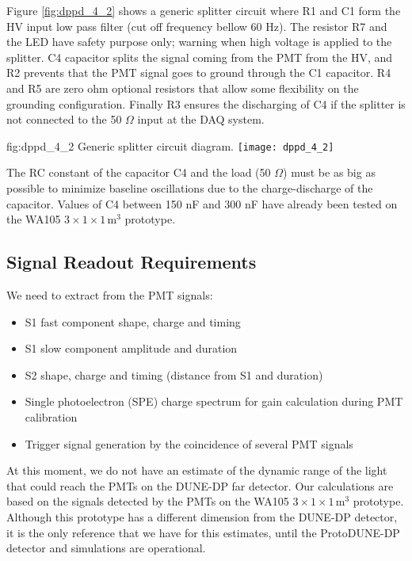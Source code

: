 Figure \ref{fig:dppd_4_2} shows a generic splitter circuit where R1 and C1 form the HV input low pass filter (cut off frequency bellow 60 Hz). The resistor R7 and the LED have safety purpose only; warning when high voltage is applied to the splitter. C4 capacitor splits the signal coming from the PMT from the HV, and R2 prevents that the PMT signal goes to ground through the C1 capacitor. R4 and R5 are zero ohm optional resistors that allow some flexibility on the grounding configuration. Finally R3 ensures the discharging of C4 if the splitter is not connected to the 50 $\Omega$ input at the DAQ system.

\begin{dunefigure}{fig:dppd_4_2}
{Generic splitter circuit diagram.}
\texttt{[image: dppd\_4\_2]}
\end{dunefigure}

The RC constant of the capacitor C4 and the load (50 $\Omega$) must be as big as possible to minimize baseline oscillations due to the charge-discharge of the capacitor. Values of C4 between 150 nF and 300 nF have already been tested on the WA105 $3\times1\times1$\,m$^3$ prototype.

\subsection{Signal Readout Requirements}
\label{sec:fddp-pd-4.3}

We need to extract from the PMT signals:
\begin{itemize}
\item S1 fast component shape, charge and timing
\item S1 slow component amplitude and duration
\item S2 shape, charge and timing (distance from S1 and duration)
\item Single photoelectron (SPE) charge spectrum for gain calculation during PMT calibration
\item Trigger signal generation by the coincidence of several PMT signals
\end{itemize}

At this moment, we do not have an estimate of the dynamic range of the light that could reach the PMTs on the DUNE-DP far detector. %
Our calculations are based on the signals detected by the PMTs on the WA105 $3\times1\times1$\,m$^3$ prototype. Although this prototype has a different dimension from the DUNE-DP detector, it is the only reference that we have for this estimates, until the ProtoDUNE-DP detector and simulations are operational.

